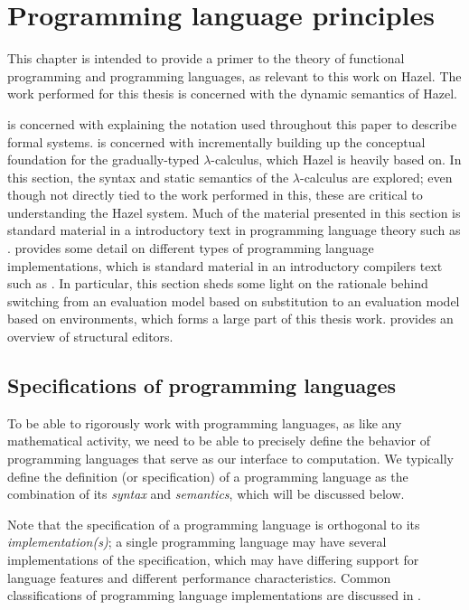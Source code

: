 \chapter{Programming language principles}
\label{sec:prog_lang_principles}

This chapter is intended to provide a primer to the theory of functional programming and programming languages, as relevant to this work on Hazel. The work performed for this thesis is concerned with the dynamic semantics of Hazel.

 is concerned with explaining the notation used throughout this paper to describe formal systems.  is concerned with incrementally building up the conceptual foundation for the gradually-typed $\lambda$-calculus, which Hazel is heavily based on. In this section, the syntax and static semantics of the $\lambda$-calculus are explored; even though not directly tied to the work performed in this, these are critical to understanding the Hazel system. Much of the material presented in this section is standard material in a introductory text in programming language theory such as \cite{harper2016practical}.  provides some detail on different types of programming language implementations, which is standard material in an introductory compilers text such as \cite{aho86}. In particular, this section sheds some light on the rationale behind switching from an evaluation model based on substitution to an evaluation model based on environments, which forms a large part of this thesis work.  provides an overview of structural editors.

\section{Specifications of programming languages}
\label{sec:prog-lang-def}

To be able to rigorously work with programming languages, as like any mathematical activity, we need to be able to precisely define the behavior of programming languages that serve as our interface to computation. We typically define the definition (or specification) of a programming language as the combination of its \textit{syntax} and \textit{semantics}, which will be discussed below.

Note that the specification of a programming language is orthogonal to its \textit{implementation(s)}; a single programming language may have several implementations of the specification, which may have differing support for language features and different performance characteristics. Common classifications of programming language implementations are discussed in .

